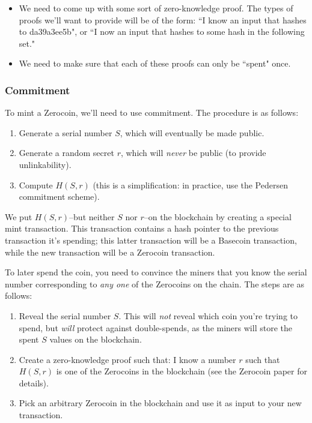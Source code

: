 \documentclass[12pt]{article}
\begin{document}
\begin{itemize}
\item We need to come up with some sort of zero-knowledge proof. The types of proofs we'll want to provide will be of the form: ``I know an input that hashes to da39a3ee5b", or ``I now an input that hashes to some hash in the following set."
\item We need to make sure that each of these proofs can only be ``spent" once.
\end{itemize}

\subsubsection*{Commitment}

To mint a Zerocoin, we'll need to use commitment. The procedure is as follows:
\begin{enumerate}
\item Generate a serial number $S$, which will eventually be made public.
\item Generate a random secret $r$, which will \textit{never} be public (to provide unlinkability).
\item Compute $H(S, r)$ (this is a simplification: in practice, use the Pedersen commitment scheme).
\end{enumerate}

We put $H(S, r)$--but neither $S$ nor $r$--on the blockchain by creating a special mint transaction. This transaction contains a hash pointer to the previous transaction it's spending; this latter transaction will be a Basecoin transaction, while the new transaction will be a Zerocoin transaction.

To later spend the coin, you need to convince the miners that you know the serial number corresponding to \textit{any one} of the Zerocoins on the chain. The steps are as follows:
\begin{enumerate}
\item Reveal the serial number $S$. This will \textit{not} reveal which coin you're trying to spend, but \textit{will} protect against double-spends, as the miners will store the spent $S$ values on the blockchain.
\item Create a zero-knowledge proof such that: I know a number $r$ such that $H(S, r)$ is one of the Zerocoins in the blockchain (see the Zerocoin paper for details).
\item Pick an arbitrary Zerocoin in the blockchain and use it as input to your new transaction.
\end{enumerate}
\end{document}

